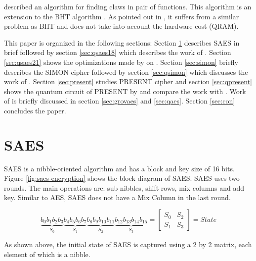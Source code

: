\documentclass[preprint]{transcrypto}
\begin{document}
\cite{claw} described an algorithm for finding claws in pair of functions. This algorithm is an extension to the BHT algorithm \cite{bht}. As pointed out in \cite{bj}, it suffers from a similar problem as BHT and does not take into account the hardware cost (QRAM).

This paper is organized in the following sections: Section \ref{sec:saes} describes SAES in brief followed by section \ref{sec:qsaes18} which describes the work of \cite{Almazrooie}. Section \ref{sec:qsaes21} shows the optimizations made by \cite{Jang} on \cite{Almazrooie}. Section \ref{sec:simon} briefly describes the SIMON cipher followed by section \ref{sec:qsimon} which discusses the work of \cite{gos}. Section \ref{sec:present} studies PRESENT cipher and section \ref{sec:qpresent} shows the quantum circuit of PRESENT by \cite{gop} and compare the work with \cite{gos}. Work of \cite{aeslowmc} is briefly discussed in section \ref{sec:grovaes} and \ref{sec:qaes}. Section \ref{sec:con} concludes the paper.


\section{SAES}\label{sec:saes}

SAES is a nibble-oriented algorithm and has a block and key size of 16 bits. Figure \ref{fig:saes-encryption} shows the block diagram of SAES. SAES uses two rounds. The main operations are: sub nibbles, shift rows, mix columns and add key. Similar to AES, SAES does not have a Mix Column in the last round.

\[
    \underbrace{b_0b_1b_2b_3}_\text{$S_0$}  
    \underbrace{b_4b_5b_6b_7}_\text{$S_1$}
    \underbrace{b_8b_9b_{10}b_{11}}_\text{$S_2$}
    \underbrace{b_{12}b_{13}b_{14}b_{15 }}_\text{$S_3$} = 
    \begin{bmatrix}
    S_0 & S_2\\
    S_1 & S_3
    \end{bmatrix} 
    = State
\]

As shown above, the initial state of SAES is captured using a 2 by 2 matrix, each element of which is a nibble.
\end{document}
